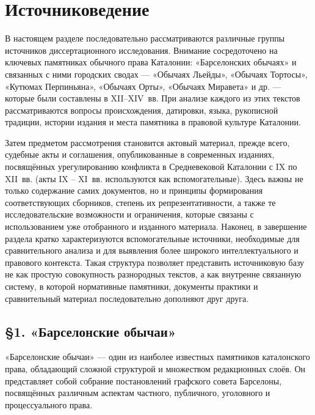 
\section*{Источниковедение}

В настоящем разделе последовательно рассматриваются различные группы источников диссертационного исследования. Внимание сосредоточено на ключевых памятниках обычного права Каталонии: «Барселонских обычаях» и связанных с ними городских сводах --- «Обычаях Льейды», «Обычаях Тортосы», «Кутюмах Перпиньяна», «Обычаях Орты», «Обычаях Миравета» и др. --- которые были составлены в XII--XIV~вв. При анализе каждого из этих текстов рассматриваются вопросы происхождения, датировки, языка, рукописной традиции, истории издания и места памятника в правовой культуре Каталонии.

Затем предметом рассмотрения становится актовый материал, прежде всего, судебные акты и соглашения, опубликованные в современных изданиях, посвящённых урегулированию конфликта в Средневековой Каталонии с IX по XII~вв. (акты IX -- XI~вв. используются как вспомогательные). Здесь важны не только содержание самих документов, но и принципы формирования соответствующих сборников, степень их репрезентативности, а также те исследовательские возможности и ограничения, которые связаны с использованием уже отобранного и изданного материала. Наконец, в завершение раздела кратко характеризуются вспомогательные источники, необходимые для сравнительного анализа и для выявления более широкого интеллектуального и правового контекста. Такая структура позволяет представить источниковую базу не как простую совокупность разнородных текстов, а как внутренне связанную систему, в которой нормативные памятники, документы практики и сравнительный материал последовательно дополняют друг друга.

\subsection*{§1. «Барселонские обычаи»}

«Барселонские обычаи» --- один из наиболее известных памятников каталонского права, обладающий сложной структурой и множеством редакционных слоёв. Он представляет собой собрание постановлений графского совета Барселоны, посвящённых различным аспектам частного, публичного, уголовного и процессуального права.

